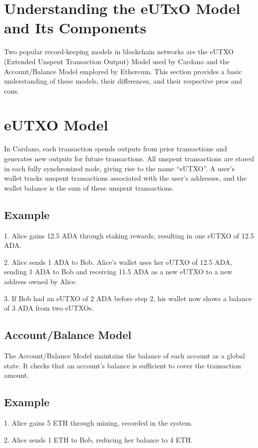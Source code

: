 \section{Understanding the eUTxO Model and Its Components} \label{sec:exploring}

Two popular record-keeping models in blockchain networks are the eUTXO (Extended Unspent Transaction Output) Model used by Cardano and the Account/Balance Model employed by Ethereum. This section provides a basic understanding of these models, their differences, and their respective pros and cons.

\section{eUTXO Model}
In Cardano, each transaction spends outputs from prior transactions and generates new outputs for future transactions. All unspent transactions are stored in each fully synchronized node, giving rise to the name ``eUTXO''. A user’s wallet tracks unspent transactions associated with the user's addresses, and the wallet balance is the sum of these unspent transactions.

\subsection{Example}
1. Alice gains 12.5 ADA through staking rewards, resulting in one eUTXO of 12.5 ADA.

2. Alice sends 1 ADA to Bob. Alice’s wallet uses her eUTXO of 12.5 ADA, sending 1 ADA to Bob and receiving 11.5 ADA as a new eUTXO to a new address owned by Alice.

3. If Bob had an eUTXO of 2 ADA before step 2, his wallet now shows a balance of 3 ADA from two eUTXOs.

\subsection{Account/Balance Model}
The Account/Balance Model maintains the balance of each account as a global state. It checks that an account's balance is sufficient to cover the transaction amount.

\subsection{Example}
1. Alice gains 5 ETH through mining, recorded in the system.

2. Alice sends 1 ETH to Bob, reducing her balance to 4 ETH.

